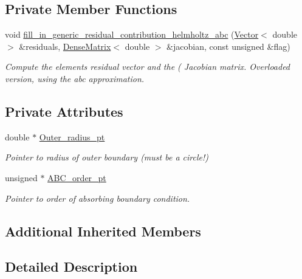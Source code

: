\subsection*{Private Member Functions}
\begin{DoxyCompactItemize}
\item 
void \hyperlink{classoomph_1_1HelmholtzAbsorbingBCElement_a25fb70fd99fc41f78f9afe6a3d8a445e}{fill\+\_\+in\+\_\+generic\+\_\+residual\+\_\+contribution\+\_\+helmholtz\+\_\+abc} (\hyperlink{classoomph_1_1Vector}{Vector}$<$ double $>$ \&residuals, \hyperlink{classoomph_1_1DenseMatrix}{Dense\+Matrix}$<$ double $>$ \&jacobian, const unsigned \&flag)
\begin{DoxyCompactList}\small\item\em Compute the element\textquotesingle{}s residual vector and the ( Jacobian matrix. Overloaded version, using the abc approximation. \end{DoxyCompactList}\end{DoxyCompactItemize}
\subsection*{Private Attributes}
\begin{DoxyCompactItemize}
\item 
double $\ast$ \hyperlink{classoomph_1_1HelmholtzAbsorbingBCElement_a45e39fb94adc88e2c92c0fb1ed27592e}{Outer\+\_\+radius\+\_\+pt}
\begin{DoxyCompactList}\small\item\em Pointer to radius of outer boundary (must be a circle!) \end{DoxyCompactList}\item 
unsigned $\ast$ \hyperlink{classoomph_1_1HelmholtzAbsorbingBCElement_a36408a03895d4d23d3e1441f270fe96d}{A\+B\+C\+\_\+order\+\_\+pt}
\begin{DoxyCompactList}\small\item\em Pointer to order of absorbing boundary condition. \end{DoxyCompactList}\end{DoxyCompactItemize}
\subsection*{Additional Inherited Members}


\subsection{Detailed Description}

